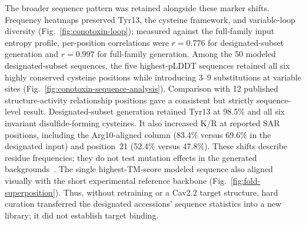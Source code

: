 The broader sequence pattern was retained alongside these marker shifts. Frequency heatmaps
preserved Tyr13, the cysteine framework, and variable-loop diversity
(Fig.~\ref{fig:conotoxin-loop}); measured against the full-family input entropy profile,
per-position correlations were $r=0.776$ for designated-subset generation and $r=0.997$ for
full-family generation. Among the 50 modeled designated-subset sequences, the five
highest-pLDDT sequences retained all six highly conserved cysteine positions while introducing
3--9 substitutions at variable sites (Fig.~\ref{fig:conotoxin-sequence-analysis}).
Comparison with 12 published structure-activity relationship positions gave a consistent but
strictly sequence-level result. Designated-subset generation retained Tyr13 at 98.5\% and all
six invariant disulfide-forming cysteines. It also increased K/R at reported SAR
positions, including the Arg10-aligned column (83.4\% versus 69.6\% in the designated input) and
position~21 (52.4\% versus 47.8\%). These shifts describe residue frequencies; they do not test
mutation effects in the generated backgrounds~\cite{kimTyr13Essential1995,satoBasicResidues1993,lewisConotoxinSAR2012}.
The single highest-TM-score modeled sequence also aligned visually with the short experimental
reference backbone (Fig.~\ref{fig:fold-superposition}). Thus, without
retraining or a Cav2.2 target structure, hard curation transferred the designated accessions'
sequence statistics into a new library; it did not establish target binding.

